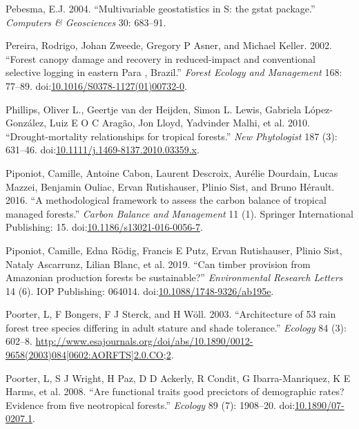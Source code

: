 \documentclass[]{elsarticle} %
\begin{document}
\hypertarget{ref-gstat}{}
Pebesma, E.J. 2004. ``Multivariable geostatistics in S: the gstat
package.'' \emph{Computers \& Geosciences} 30: 683--91.

\hypertarget{ref-Pereira2002}{}
Pereira, Rodrigo, Johan Zweede, Gregory P Asner, and Michael Keller.
2002. ``Forest canopy damage and recovery in reduced-impact and
conventional selective logging in eastern Para , Brazil.'' \emph{Forest
Ecology and Management} 168: 77--89.
doi:\href{https://doi.org/10.1016/S0378-1127(01)00732-0}{10.1016/S0378-1127(01)00732-0}.

\hypertarget{ref-Phillips2010}{}
Phillips, Oliver L., Geertje van der Heijden, Simon L. Lewis, Gabriela
López-González, Luiz E O C Aragão, Jon Lloyd, Yadvinder Malhi, et al.
2010. ``Drought-mortality relationships for tropical forests.''
\emph{New Phytologist} 187 (3): 631--46.
doi:\href{https://doi.org/10.1111/j.1469-8137.2010.03359.x}{10.1111/j.1469-8137.2010.03359.x}.

\hypertarget{ref-Piponiot2016}{}
Piponiot, Camille, Antoine Cabon, Laurent Descroix, Aurélie Dourdain,
Lucas Mazzei, Benjamin Ouliac, Ervan Rutishauser, Plinio Sist, and Bruno
Hérault. 2016. ``A methodological framework to assess the carbon balance
of tropical managed forests.'' \emph{Carbon Balance and Management} 11
(1). Springer International Publishing: 15.
doi:\href{https://doi.org/10.1186/s13021-016-0056-7}{10.1186/s13021-016-0056-7}.

\hypertarget{ref-Piponiot2019}{}
Piponiot, Camille, Edna Rödig, Francis E Putz, Ervan Rutishauser, Plinio
Sist, Nataly Ascarrunz, Lilian Blanc, et al. 2019. ``Can timber
provision from Amazonian production forests be sustainable?''
\emph{Environmental Research Letters} 14 (6). IOP Publishing: 064014.
doi:\href{https://doi.org/10.1088/1748-9326/ab195e}{10.1088/1748-9326/ab195e}.

\hypertarget{ref-Poorter2003}{}
Poorter, L, F Bongers, F J Sterck, and H Wöll. 2003. ``Architecture of
53 rain forest tree species differing in adult stature and shade
tolerance.'' \emph{Ecology} 84 (3): 602--8.
\href{http://www.esajournals.org/doi/abs/10.1890/0012-9658(2003)084\%5B0602:AORFTS\%5D2.0.CO;2}{http://www.esajournals.org/doi/abs/10.1890/0012-9658(2003)084{[}0602:AORFTS{]}2.0.CO;2}.

\hypertarget{ref-Poorter2008a}{}
Poorter, L, S J Wright, H Paz, D D Ackerly, R Condit, G
Ibarra-Manriquez, K E Harms, et al. 2008. ``Are functional traits good
precictors of demographic rates? Evidence from five neotropical
forests.'' \emph{Ecology} 89 (7): 1908--20.
doi:\href{https://doi.org/10.1890/07-0207.1}{10.1890/07-0207.1}.
\end{document}
